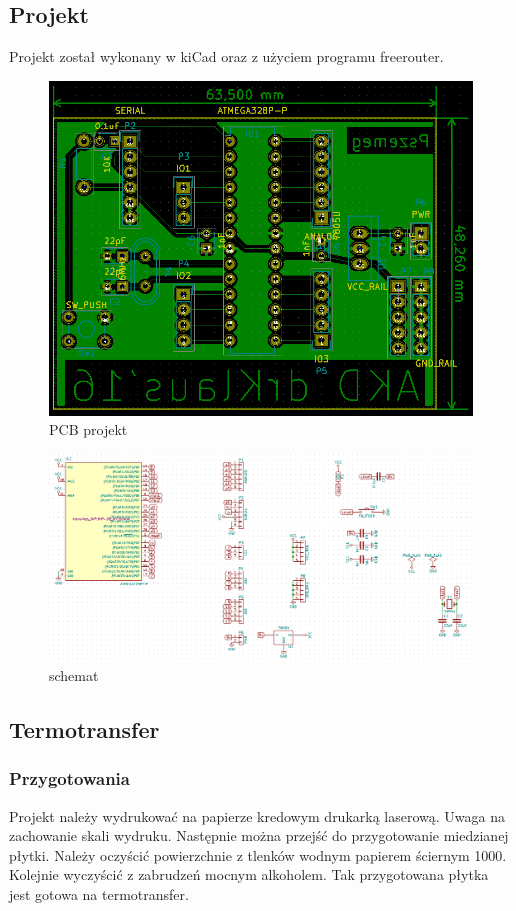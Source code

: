 \documentclass[a4paper,11pt]{article}
\def\SCALE{0.6}
\begin{document}
\subsection{Projekt}
Projekt został wykonany w kiCad oraz z użyciem programu freerouter.
\begin{figure}[H]
	\centering
	\includegraphics[width=\SCALE
	\paperwidth]{pcb}
	\caption{PCB projekt}
\end{figure}
\begin{figure}[H]
	\centering
	\includegraphics[width=\SCALE
	\paperwidth]{schemat}
	\caption{schemat}
\end{figure}
\subsection{Termotransfer}
\subsubsection{Przygotowania}
Projekt należy wydrukować na papierze kredowym drukarką laserową. Uwaga na zachowanie skali wydruku. Następnie można przejść do przygotowanie miedzianej płytki. Należy oczyścić powierzchnie z tlenków wodnym papierem ściernym 1000. Kolejnie wyczyścić z zabrudzeń mocnym alkoholem. Tak przygotowana płytka jest gotowa na termotransfer.
\end{document}
